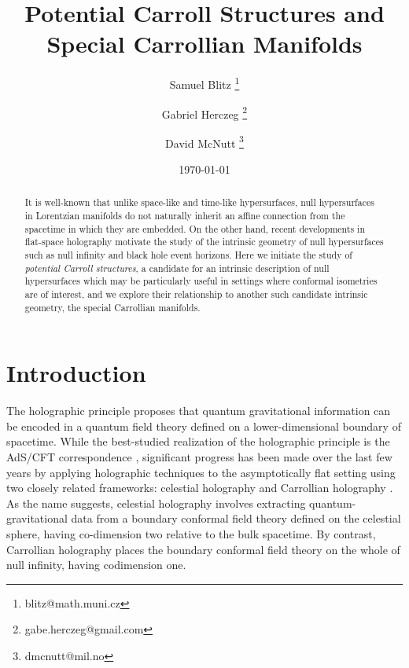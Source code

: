 \documentclass{article}
\title{Potential Carroll Structures and Special Carrollian Manifolds}
\author[1]{Samuel Blitz \thanks{blitz@math.muni.cz}}
\affil[1]{Department of 
Mathematics and Statistics, Masaryk University, Brno, Czech Republic}
\author[2]{Gabriel Herczeg \thanks{gabe.herczeg@gmail.com}}
\affil[2]{Brown University, Providence, RI, 02912, USA  }
\author[3]{David McNutt \thanks{dmcnutt@mil.no}}
\affil[3]{The Royal Norwegian Naval Academy, N-5165 Bergen, Norway }
\date{\today}
\theoremstyle{definition}
\theoremstyle{remark}
\begin{document}
\maketitle

\begin{abstract}
It is well-known that unlike space-like and time-like hypersurfaces, null hypersurfaces in Lorentzian manifolds do not naturally inherit an affine connection from the spacetime in which they are embedded. On the other hand, recent developments in flat-space holography motivate the study of the intrinsic geometry of null hypersurfaces such as null infinity and black hole event horizons. Here we initiate the study of \emph{potential Carroll structures}, a candidate for an intrinsic description of null hypersurfaces which may be particularly useful in settings where conformal isometries are of interest, and we explore their relationship to another such candidate intrinsic geometry, the special Carrollian manifolds.
\end{abstract}

\tableofcontents

\bigskip

\section{Introduction}
The holographic principle proposes that quantum gravitational information can be encoded in a quantum field theory defined on a lower-dimensional boundary of spacetime\cite{tHooft:1993dmi,Susskind:1994vu, Bousso:2002ju}.
While the best-studied realization of the holographic principle is the AdS/CFT correspondence
\cite{Maldacena:1997re,Gubser:1998bc,Witten:1998qj}, significant progress has been made over the last few years by applying holographic techniques to the asymptotically flat setting using two closely related frameworks: celestial holography \cite{He:2014laa, He:2014cra, Strominger:2014pwa, Pasterski:2015zua, Raclariu:2021zjz} and Carrollian holography \cite{Duval:2014uva, Donnay:2022wvx, Donnay:2022aba, Bagchi:2022emh}.  As the name suggests, celestial holography involves extracting quantum-gravitational data from  a  boundary conformal field theory defined on the celestial sphere, having co-dimension two relative to the  bulk spacetime. By contrast, Carrollian holography places the boundary conformal field theory on the whole of null infinity, having codimension one. 
\end{document}
